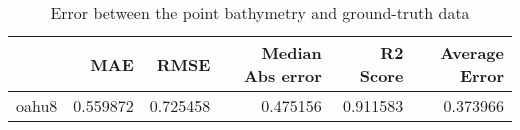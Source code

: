 \begin{table}[h!]
\caption{Error between the point bathymetry and ground-truth data}
\label{tab:oahu8_lidar_error}
\begin{tabular}{lrrrrr}
\toprule
 & MAE & RMSE & Median Abs error & R2 Score & Average Error \\
\midrule
oahu8 & 0.559872 & 0.725458 & 0.475156 & 0.911583 & 0.373966 \\
\bottomrule
\end{tabular}
\end{table}
